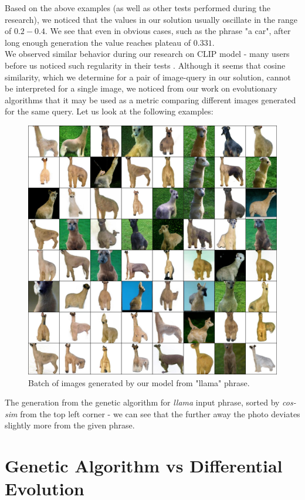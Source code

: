\documentclass[11pt,a4paper,openany]{book}
\begin{document}
\noindent Based on the above examples (as well as other tests performed during the research), we noticed that the values in our solution usually oscillate in the range of $0.2 - 0.4$. We see that even in obvious cases, such as the phrase "a car", after long enough generation the value reaches plateau of $0.331$.  \\
\noindent We observed similar behavior during our research on CLIP model - many users before us noticed such regularity in their tests \cite{clipresults}.
Although it seems that cosine similarity, which we determine for a pair of image-query in our solution, cannot be interpreted for a single image, we noticed from our work on evolutionary algorithms that it may be used as a metric comparing different images generated for the same query. Let us look at the following examples:
\begin{figure}[H]
    \centering
    \includegraphics[scale=0.2]{figs/batch_loop_7.jpg}
    \caption{Batch of images generated by our model from "llama" phrase.}
\end{figure}
\noindent The generation from the genetic algorithm for \textit{llama} input phrase,  sorted by \textit{cos-sim} from the top left corner - we can see that the further away the photo deviates slightly more from the given phrase. 

\section{Genetic Algorithm vs Differential Evolution}
\end{document}
